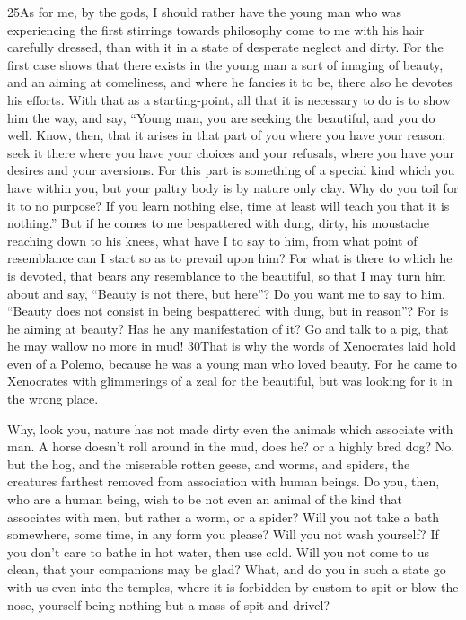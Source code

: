 25As for me, by the gods, I should rather have the young man who was experiencing the first stirrings towards philosophy come to me with his hair carefully dressed, than with it in a state of desperate neglect and dirty. For the first case shows that there exists in the young man a sort of imaging of beauty, and an aiming at comeliness, and where he fancies it to be, there also he devotes his efforts. With that as a starting-point, all that it is necessary to do is to show him the way, and say, ``Young man, you are seeking the beautiful, and you do well. Know, then, that it arises in that part of you where you have your reason; seek it there where you have your choices and your refusals, where you have your desires and your aversions. For this part is something of a special kind which you have within you, but your paltry body is by nature only clay. Why do you toil for it to no purpose? If you learn nothing else, time at least will teach you that it is nothing.'' But if he comes to me bespattered with dung, dirty, his moustache reaching down to his knees, what have I to say to him, from what point of resemblance can I start so as to prevail upon him? For what is there to which he is devoted, that bears any resemblance to the beautiful, so that I may turn him about and say, ``Beauty is not there, but here''? Do you want me to say to him, ``Beauty does not consist in being bespattered with dung, but in reason''? For is he aiming at beauty? Has he any manifestation of it? Go and talk to a pig, that he may wallow no more in mud! 30That is why the words of Xenocrates laid hold even of a Polemo, because he was a young man who loved beauty. For he came to Xenocrates with glimmerings of a zeal for the beautiful, but was looking for it in the wrong place.

Why, look you, nature has not made dirty even the animals which associate with man. A horse doesn't roll around in the mud, does he? or a highly bred dog? No, but the hog, and the miserable rotten geese, and worms, and spiders, the creatures farthest removed from association with human beings. Do you, then, who are a human being, wish to be not even an animal of the kind that associates with men, but rather a worm, or a spider? Will you not take a bath somewhere, some time, in any form you please? Will you not wash yourself? If you don't care to bathe in hot water, then use cold. Will you not come to us clean, that your companions may be glad? What, and do you in such a state go with us even into the temples, where it is forbidden by custom to spit or blow the nose, yourself being nothing but a mass of spit and drivel?

